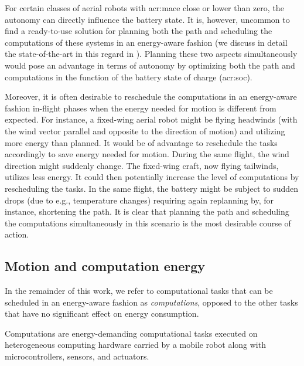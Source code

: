 For certain classes of aerial robots with \Gls{acr:mace} close or lower than zero, the autonomy can directly influence the battery state. It is, however, uncommon to find a ready-to-use solution for planning both the path and scheduling the computations of these systems in an energy-aware fashion (we discuss in detail the state-of-the-art in this regard in ). Planning these two aspects simultaneously would pose an advantage in terms of autonomy by optimizing both the path and computations in the function of the battery state of charge (\Gls{acr:soc}). 

Moreover, it is often desirable to reschedule the computations in an energy-aware fashion in-flight phases when the energy needed for motion is different from expected. For instance, a fixed-wing aerial robot might be flying headwinds (with the wind vector parallel and opposite to the direction of motion) and utilizing more energy than planned. It would be of advantage to reschedule the tasks accordingly to save energy needed for motion. During the same flight, the wind direction might suddenly change. The fixed-wing craft, now flying tailwinds, utilizes less energy. It could then potentially increase the level of computations by rescheduling the tasks. In the same flight, the battery might be subject to sudden drops (due to e.g., temperature changes) requiring again replanning by, for instance, shortening the path. It is clear that planning the path and scheduling the computations simultaneously in this scenario is the most desirable course of action.

\subsection{Motion and computation energy}

In the remainder of this work, we refer to computational tasks that can be scheduled in an energy-aware fashion as \emph{computations}, opposed to the other tasks that have no significant effect on energy consumption.

\begin{highlight}
  \begin{defn}[Computations]\label{def:comps}
    Computations are energy-demanding computational tasks executed on heterogeneous computing hardware carried by a mobile robot along with microcontrollers, sensors, and actuators.
  \end{defn}
\end{highlight}

